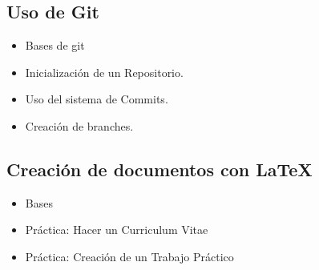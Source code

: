 \documentclass{article}
\begin{document}
\subsection{Uso de Git}
\begin{itemize}
	\item Bases de git
	\item Inicialización de un Repositorio.
	\item Uso del sistema de Commits.
	\item Creación de branches.
\end{itemize}

\subsection{Creación de documentos con \LaTeX}
\begin{itemize}
	\item Bases
	\item Práctica: Hacer un Curriculum Vitae
	\item Práctica: Creación de un Trabajo Práctico
\end{itemize}
\end{document}
